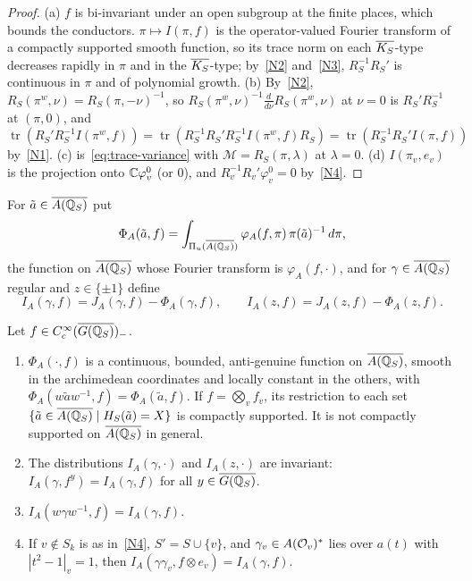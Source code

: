 \begin{proof}
(a) $f$ is bi-invariant under an open subgroup at the finite places, which
bounds the conductors. $\pi\mapsto I(\pi,f)$ is the operator-valued
Fourier transform of a compactly supported smooth function, so its trace
norm on each $\overline{K_S}$-type decreases rapidly in $\pi$ and in the
$\overline{K_S}$-type; by~\ref{N2} and~\ref{N3}, $R_S^{-1}R_S'$ is continuous in
$\pi$ and of polynomial growth. (b) By~\ref{N2}, $R_S(\pi^w,\nu)=R_S(\pi,-\nu)^{-1}$, so
$R_S(\pi^w,\nu)^{-1}\frac{d}{d\nu}R_S(\pi^w,\nu)$ at $\nu=0$ is
$R_S'R_S^{-1}$ at $(\pi,0)$, and
$\operatorname{tr}(R_S'R_S^{-1}I(\pi^w,f))=\operatorname{tr}(R_S^{-1}R_S'
R_S^{-1}I(\pi^w,f)R_S)=\operatorname{tr}(R_S^{-1}R_S'I(\pi,f))$
by~\ref{N1}. (c) is~\eqref{eq:trace-variance} with $\mathcal
M=R_S(\pi,\lambda)$ at $\lambda=0$. (d) $I(\pi_v,e_v)$ is the projection
onto $\mathbb{C}\varphi^0_v$ (or $0$), and $R_v^{-1}R_v'\varphi_v^0=0$
by~\ref{N4}.
\end{proof}

For $\tilde a\in\overline{A(\mathbb{Q}_S)}$ put
\begin{equation}\label{eq:PhiA}
\Phi_A(\tilde a,f)=\int_{\Pi_u(\overline{A(\mathbb{Q}_S)})}\varphi_A(f,\pi)\,\pi(\tilde a)^{-1}\,
d\pi,
\end{equation}
the function on $\overline{A(\mathbb{Q}_S)}$ whose Fourier transform is $\varphi_A(f,\cdot)$,
and for $\gamma\in\overline{A(\mathbb{Q}_S)}$ regular and $z\in\{\pm1\}$ define
\begin{equation}\label{eq:IAgamma}
I_A(\gamma,f)=J_A(\gamma,f)-\Phi_A(\gamma,f),\qquad
I_A(z,f)=J_A(z,f)-\Phi_A(z,f).
\end{equation}

\begin{theorem}\label{thm:IA}
Let $f\in C_c^\infty(\overline{G(\mathbb{Q}_S)})_-$.
\begin{enumerate}[label=(\alph*)]
\item $\Phi_A(\cdot,f)$ is a continuous, bounded, anti-genuine function
  on $\overline{A(\mathbb{Q}_S)}$, smooth in the archimedean coordinates and locally constant in
  the others, with
  $\Phi_A(w\tilde aw^{-1},f)=\Phi_A(\tilde a,f)$. If $f=\bigotimes_vf_v$,
  its restriction to each set $\{\tilde a\in\overline{A(\mathbb{Q}_S)}\mid H_S(\tilde a)=X\}$ is
  compactly supported. It is not compactly supported on $\overline{A(\mathbb{Q}_S)}$ in general.
\item The distributions $I_A(\gamma,\cdot)$ and $I_A(z,\cdot)$ are
  invariant: $I_A(\gamma,f^y)=I_A(\gamma,f)$ for all $y\in\overline{G(\mathbb{Q}_S)}$.
\item $I_A(w\gamma w^{-1},f)=I_A(\gamma,f)$.
\item If $v\notin S_k$ is as in~\ref{N4}, $S'=S\cup\{v\}$, and
  $\gamma_v\in A(\mathcal{O}_v)^*$ lies over $a(t)$ with $|t^2-1|_v=1$, then
  $I_A(\gamma\gamma_v,f\otimes e_v)=I_A(\gamma,f)$.
\end{enumerate}
\end{theorem}

